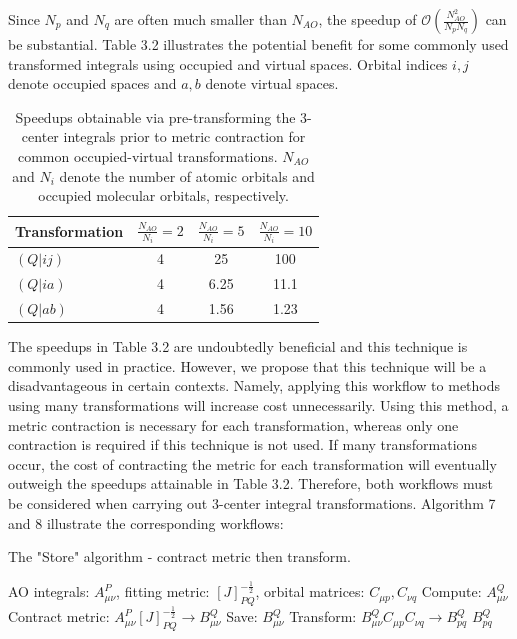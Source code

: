 \noindent Since $N_p$ and $N_q$ are often much smaller than $N_{AO}$, the speedup of 
$\mathcal{O}(\frac{N_{AO}^2}{N_pN_q})$ can be substantial. 
Table 3.2 illustrates the potential benefit for some commonly used transformed integrals using occupied and virtual spaces.
Orbital indices $i,j$ denote occupied spaces and $a,b$ denote virtual spaces.

\begingroup
\begin{table}[H]
\centering
\renewcommand{\baselinestretch}{1}
\caption{Speedups obtainable via pre-transforming the 3-center integrals prior to metric contraction for common occupied-virtual transformations.
$N_{AO}$ and $N_i$ denote the number of atomic orbitals and occupied molecular orbitals, respectively. }
\begin{tabular}{l c c c}
\multicolumn{1}{l}{\textbf{Transformation}} &
\multicolumn{1}{c}{\textbf{$\frac{N_{AO}}{N_i}=2$}} & 
\multicolumn{1}{c}{\textbf{$\frac{N_{AO}}{N_i}=5$}} & 
\multicolumn{1}{c}{\textbf{$\frac{N_{AO}}{N_i}=10$}} \\ 
\hline
$(Q|ij)$       & 4               & 25              & 100      \\ 
$(Q|ia)$       & 4               & 6.25            & 11.1     \\ 
$(Q|ab)$        & 4              & 1.56            & 1.23     \\
\end{tabular}
\end{table}
\endgroup

The speedups in Table 3.2 are undoubtedly beneficial and this technique is commonly used in practice. 
However, we propose that this technique will be a disadvantageous in certain contexts. 
Namely, applying this workflow to methods using many transformations will increase cost unnecessarily. 
Using this method, a metric contraction is necessary for each transformation, whereas only one contraction is required if this technique is not used.
If many transformations occur, the cost of contracting the metric for 
each transformation will eventually outweigh the speedups attainable in Table 3.2. Therefore, both workflows must be considered when carrying
out 3-center integral transformations. Algorithm 7 and 8 illustrate the corresponding workflows:

\begin{algorithm}[H]
\caption{The "Store" algorithm - contract metric then transform.}
\begin{algorithmic}
\REQUIRE AO integrals: $A_{\mu \nu}^P$, fitting metric: $[J]_{PQ}^{-\frac{1}{2}}$, orbital matrices: $C_{\mu p}, C_{\nu q}$
\STATE Compute: $A_{\mu \nu}^Q$
\STATE Contract metric: $A_{\mu \nu}^P [J]_{PQ}^{-\frac{1}{2}} \rightarrow B_{\mu \nu}^Q$
\STATE Save: $B_{\mu \nu}^Q$
    \STATE Transform: $B_{\mu \nu}^QC_{\mu p}C_{\nu q} \rightarrow B_{p q}^Q$
\ENDFOR
\RETURN $B_{p q}^Q$
\end{algorithmic}
\end{algorithm}

